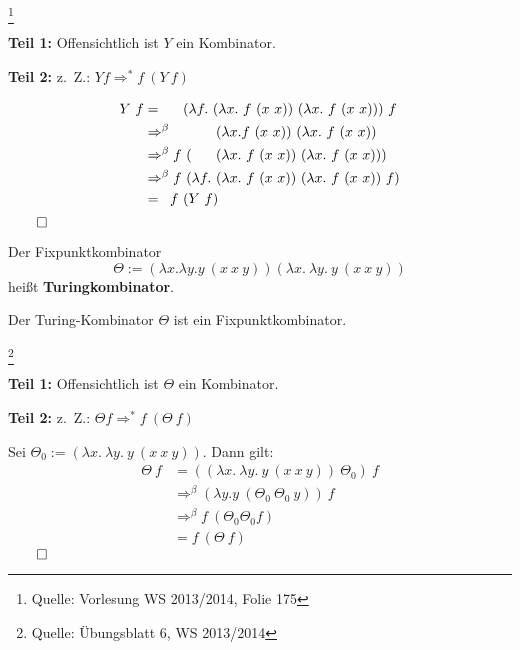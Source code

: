 \begin{beweis}\footnote{Quelle: Vorlesung WS 2013/2014, Folie 175}\leavevmode

    \textbf{Teil 1:} Offensichtlich ist $Y$ ein Kombinator.

    \textbf{Teil 2:} z.~Z.: $Y f \Rightarrow^* f \ (Y \ f)$

    \begin{align*}
        Y\ f     &=\hphantom{^\beta f\ } (\lambda f.\ (\lambda x.\ f\ (x\ x))\ (\lambda x.\ f\ (x\ x)))\ f\\
                 &\Rightarrow^\beta\hphantom{f \ (\lambda f.\ }  (\lambda x. f\ (x\ x))\ (\lambda x.\ f\ (x\ x))\\
                 &\Rightarrow^\beta  f \ (\hphantom{\lambda f.\ }(\lambda x.\ f\ (x\ x))\ (\lambda x.\ f\ (x\ x)))\\
                 &\Rightarrow^\beta  f \ (\lambda f.\ (\lambda x.\ f\ (x\ x))\ (\lambda x.\ f\ (x\ x))\ f)\\
                 &=\hphantom{^\beta} f \ (Y \ f)
    \end{align*}
    $\qed$
\end{beweis}

\begin{definition}[Turingkombinator]%
    Der Fixpunktkombinator
    \[\Theta := (\lambda x. \lambda y. y\ (x\ x\ y)) (\lambda x.\ \lambda y.\ y\ (x\ x\ y))\]
    heißt \textbf{Turingkombinator}.
\end{definition}

\begin{behauptung}
    Der Turing-Kombinator $\Theta$ ist ein Fixpunktkombinator.
\end{behauptung}

\begin{beweis}\footnote{Quelle: Übungsblatt 6, WS 2013/2014}

    \textbf{Teil 1:} Offensichtlich ist $\Theta$ ein Kombinator.

    \textbf{Teil 2:} z.~Z.: $\Theta f \Rightarrow^* f \ (\Theta \ f)$

    Sei $\Theta_0 := (\lambda x.\ \lambda y.\ y\ (x\ x\ y))$. Dann gilt:
    \begin{align*}
        \Theta\ f &= ((\lambda x.\ \lambda y.\ y\ (x\ x\ y))\ \Theta_0)\ f\\
                 &\Rightarrow^\beta (\lambda y. y\ (\Theta_0 \ \Theta_0 \ y))\ f\\
                 &\Rightarrow^\beta f \ (\Theta_0 \Theta_0 f)\\
                 &= f \ (\Theta \ f)
    \end{align*}
    $\qed$
\end{beweis}

